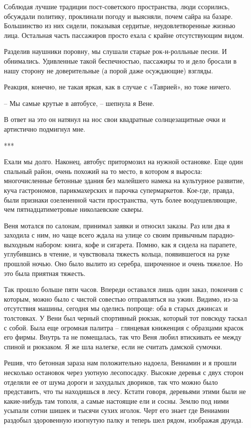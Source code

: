 \documentclass[
]{book}
\begin{document}
Соблюдая лучшие традиции пост-советского пространства, люди ссорились, обсуждали политику, проклинали погоду и выясняли, почем сайра на базаре. Большинство из них сидели, показывая сердитые, неудовлетворенные жизнью лица. Остальная часть пассажиров просто ехала с крайне отсутствующим видом.

Разделив наушники поровну, мы слушали старые рок-н-ролльные песни. И обнимались. Удивленные такой беспечностью, пассажиры то и дело бросали в нашу сторону не доверительные (а порой даже осуждающие) взгляды.

Реакция, конечно, не такая яркая, как в случае с «Таврией», но тоже ничего.

-- Мы самые крутые в автобусе, -- шепнула я Вене.

В ответ на это он натянул на нос свои квадратные солнцезащитные очки и артистично подмигнул мне.

***

Ехали мы долго. Наконец, автобус притормозил на нужной остановке. Еще один спальный район, очень похожий на то место, в котором я выросла: многочисленные бетонные здания без малейшего намека на культурное развитие, куча гастрономов, парикмахерских и парочка супермаркетов. Кое-где, правда, были признаки озелененной части пространства, чуть более воодушевляющие, чем пятнадцатиметровые николаевские скверы.

Веня мотался по салонам, принимал заявки и относил заказы. Раз или два я заходила с ним, но чаще всего ждала на улице со своим привычным парадно-выходным набором: книга, кофе и сигарета. Помню, как я сидела на парапете, углубившись в чтение, и чувствовала тяжесть кольца, появившегося на руке прошлой ночью. Оно было вылито из серебра, широченное и очень тяжелое. Но это была приятная тяжесть.

Так прошло больше пяти часов. Впереди оставался лишь один заказ, покончив с которым, можно было с чистой совестью отправляться на ужин. Видимо, из-за отсутствия машины, сегодня мы оделись попроще: оба в старых джинсах и толстовках. У Вени был черный спортивный рюкзак, который тот повсюду таскал с собой. Была еще огромная палитра -- глянцевая книженция с образцами красок его фирмы. Внутрь та не помещалась, так что Веня любил втискивать ее между спиной и рюкзаком. Я же шла налегке, если не считать дамской сумочки.

Решив, что бетонная зараза нам положительно надоела, Вениамин и я прошли несколько остановок через уютную лесопосадку. Высокие деревья с двух сторон отделяли ее от шума дороги и захудалых двориков, так что можно было представить, что ты находишься в лесу. Кстати говоря, деревьями этими были не какие-нибудь там тополя, а самые настоящие ели и сосны. Землю под ними усыпали сотни шишек и тысячи сухих иголок. Черт его знает где Вениамин раздобыл здоровенную изогнутую палку и теперь шел рядом, изображая друида.
\end{document}
